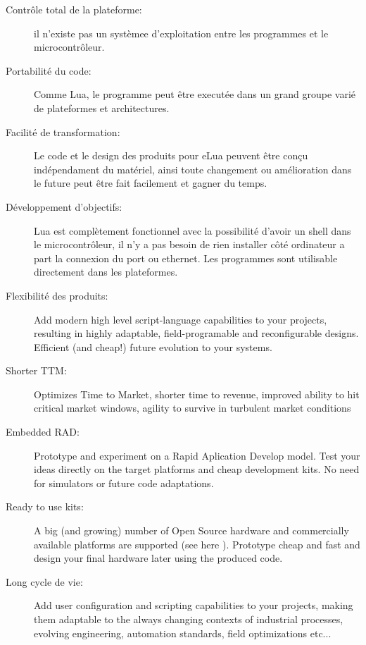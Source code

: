 \begin{description}

 \item[Contrôle total de la plateforme:] il n'existe pas un systèmee d'exploitation entre les programmes et le microcontrôleur.
 
 \item[Portabilité du code:] Comme Lua, le programme peut être executée dans un grand groupe varié de plateformes et architectures.

 \item[Facilité de transformation:] Le code et le design des produits pour eLua peuvent être conçu indépendament du matériel, ainsi toute changement ou
amélioration dans le future peut être fait facilement et gagner du temps.

 \item[Développement d'objectifs:] Lua est complètement fonctionnel avec la possibilité d'avoir un shell dans le microcontrôleur, il n'y a pas besoin 
de rien installer côté ordinateur a part la connexion du port ou ethernet. Les programmes sont utilisable directement dans les plateformes.

 \item[Flexibilité des produits:] 

Add modern high level script-language capabilities to your projects, resulting in highly adaptable, field-programable and reconfigurable designs. 
Efficient (and cheap!) future evolution to your systems.

\item[Shorter TTM:] Optimizes Time to Market, shorter time to revenue, improved ability to hit critical market windows, agility to survive in turbulent market conditions

    \item[Embedded RAD:] Prototype and experiment on a Rapid Aplication Develop model. Test your ideas directly on the target platforms and cheap development kits. No need for simulators or future code adaptations.

    \item[Ready to use kits:] A big (and growing) number of Open Source hardware and commercially available platforms are supported (see here ). Prototype cheap and fast and design your final hardware later using the produced code.

 \item[Long cycle de vie:]  Add user configuration and scripting capabilities to your projects, making them adaptable to the always changing contexts of industrial processes, evolving engineering, automation standards, field optimizations etc...



\end{description}
